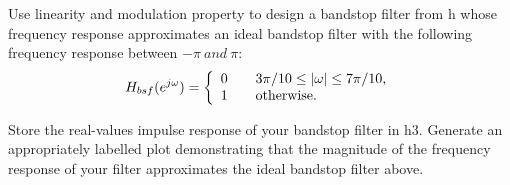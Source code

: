 Use linearity and modulation property to design a bandstop filter from h whose frequency response approximates an ideal bandstop filter with the following frequency response between $-\pi\ and\ \pi$:\\
\[ H_{bsf}(e^{j \omega}) = \left\{
  \begin{array}{l l}
    0 & \quad \text{$3\pi/10 \le |\omega| \le 7\pi/10$,} \\
    1 & \quad \text{otherwise.}
  \end{array} \right.\]

Store the real-values impulse response of your bandstop filter in h3. Generate an appropriately labelled plot demonstrating that the magnitude of the frequency response of your filter approximates the ideal bandstop filter above.
